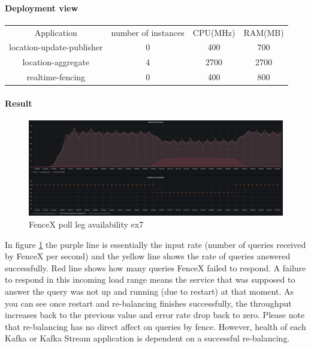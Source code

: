 \documentclass[a4]{report}
\begin{document}
        \paragraph{Deployment view}
        \begin{center}
            \begin{tabular}{ c c c c }
                Application               & number of instances & CPU(MHz) & RAM(MB) \\
                location-update-publisher & 0                   & 400      & 700     \\
                location-aggregate        & 4                   & 2700     & 2700    \\
                realtime-fencing          & 0                   & 400      & 800     \\
            \end{tabular}
        \end{center}

        \paragraph{Result}
        \begin{figure}[ht]
            \caption{FenceX poll leg availability ex7}
            \label{fig:ex7}
            \includegraphics[scale=0.4]{images/evaluation/ex7-benchmarking-ongoing-2per10sec.png}
        \end{figure}

        In figure \ref{fig:ex7} the purple line is essentially the input rate (number of queries received by FenceX per
        second) and the yellow line shows the rate of queries answered successfully.
        Red line shows how many queries FenceX failed to respond.
        A failure to respond in this incoming load range means the service that was supposed to answer the query was not
        up and running (due to restart) at that moment.
        As you can see once restart and re-balancing finishes successfully, the throughput increases back to the previous
        value and error rate drop back to zero.
        Please note that re-balancing has no direct affect on queries by fence.
        However, health of each Kafka or Kafka Stream application is dependent on a successful re-balancing.
\end{document}
